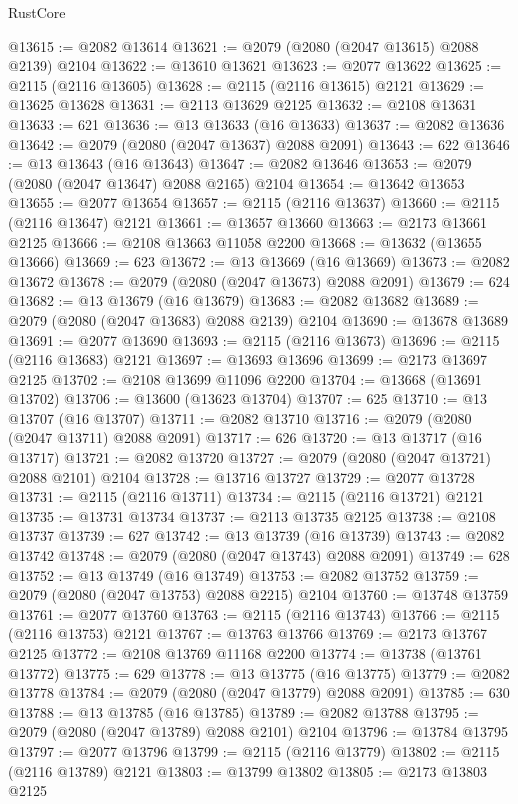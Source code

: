 \begin{lexlean}{RustCore}
\begin{coremodule}
@13615 := @2082 @13614
@13621 := @2079 (@2080 (@2047 @13615) @2088 @2139) @2104
@13622 := @13610 @13621
@13623 := @2077 @13622
@13625 := @2115 (@2116 @13605)
@13628 := @2115 (@2116 @13615) @2121
@13629 := @13625 @13628
@13631 := @2113 @13629 @2125
@13632 := @2108 @13631
@13633 := 621
@13636 := @13 @13633 (@16 @13633)
@13637 := @2082 @13636
@13642 := @2079 (@2080 (@2047 @13637) @2088 @2091)
@13643 := 622
@13646 := @13 @13643 (@16 @13643)
@13647 := @2082 @13646
@13653 := @2079 (@2080 (@2047 @13647) @2088 @2165) @2104
@13654 := @13642 @13653
@13655 := @2077 @13654
@13657 := @2115 (@2116 @13637)
@13660 := @2115 (@2116 @13647) @2121
@13661 := @13657 @13660
@13663 := @2173 @13661 @2125
@13666 := @2108 @13663 @11058 @2200
@13668 := @13632 (@13655 @13666)
@13669 := 623
@13672 := @13 @13669 (@16 @13669)
@13673 := @2082 @13672
@13678 := @2079 (@2080 (@2047 @13673) @2088 @2091)
@13679 := 624
@13682 := @13 @13679 (@16 @13679)
@13683 := @2082 @13682
@13689 := @2079 (@2080 (@2047 @13683) @2088 @2139) @2104
@13690 := @13678 @13689
@13691 := @2077 @13690
@13693 := @2115 (@2116 @13673)
@13696 := @2115 (@2116 @13683) @2121
@13697 := @13693 @13696
@13699 := @2173 @13697 @2125
@13702 := @2108 @13699 @11096 @2200
@13704 := @13668 (@13691 @13702)
@13706 := @13600 (@13623 @13704)
@13707 := 625
@13710 := @13 @13707 (@16 @13707)
@13711 := @2082 @13710
@13716 := @2079 (@2080 (@2047 @13711) @2088 @2091)
@13717 := 626
@13720 := @13 @13717 (@16 @13717)
@13721 := @2082 @13720
@13727 := @2079 (@2080 (@2047 @13721) @2088 @2101) @2104
@13728 := @13716 @13727
@13729 := @2077 @13728
@13731 := @2115 (@2116 @13711)
@13734 := @2115 (@2116 @13721) @2121
@13735 := @13731 @13734
@13737 := @2113 @13735 @2125
@13738 := @2108 @13737
@13739 := 627
@13742 := @13 @13739 (@16 @13739)
@13743 := @2082 @13742
@13748 := @2079 (@2080 (@2047 @13743) @2088 @2091)
@13749 := 628
@13752 := @13 @13749 (@16 @13749)
@13753 := @2082 @13752
@13759 := @2079 (@2080 (@2047 @13753) @2088 @2215) @2104
@13760 := @13748 @13759
@13761 := @2077 @13760
@13763 := @2115 (@2116 @13743)
@13766 := @2115 (@2116 @13753) @2121
@13767 := @13763 @13766
@13769 := @2173 @13767 @2125
@13772 := @2108 @13769 @11168 @2200
@13774 := @13738 (@13761 @13772)
@13775 := 629
@13778 := @13 @13775 (@16 @13775)
@13779 := @2082 @13778
@13784 := @2079 (@2080 (@2047 @13779) @2088 @2091)
@13785 := 630
@13788 := @13 @13785 (@16 @13785)
@13789 := @2082 @13788
@13795 := @2079 (@2080 (@2047 @13789) @2088 @2101) @2104
@13796 := @13784 @13795
@13797 := @2077 @13796
@13799 := @2115 (@2116 @13779)
@13802 := @2115 (@2116 @13789) @2121
@13803 := @13799 @13802
@13805 := @2173 @13803 @2125

\end{coremodule}
\end{lexlean}
